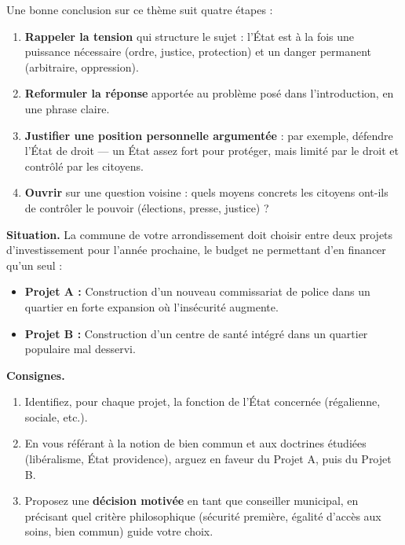 \documentclass[11pt]{article}
\newcommand{\cle}[1]{{\popxbold\color{popdark}#1}}
\begin{document}
\begin{methode}
Une bonne conclusion sur ce thème suit quatre étapes :
\begin{enumerate}
\item \textbf{Rappeler la tension} qui structure le sujet : l'État est à la fois une puissance nécessaire (ordre, justice, protection) et un danger permanent (arbitraire, oppression).
\item \textbf{Reformuler la réponse} apportée au problème posé dans l'introduction, en une phrase claire.
\item \textbf{Justifier une position personnelle argumentée} : par exemple, défendre l'État de droit — un État assez fort pour protéger, mais limité par le droit et contrôlé par les citoyens.
\item \textbf{Ouvrir} sur une question voisine : quels moyens concrets les citoyens ont-ils de contrôler le pouvoir (élections, presse, justice) ?
\end{enumerate}
\end{methode}

\begin{exercice}
\textbf{Situation.} La commune de votre arrondissement doit choisir entre deux projets d'investissement pour l'année prochaine, le budget ne permettant d'en financer qu'un seul :
\begin{itemize}
\item \textbf{Projet A :} Construction d'un nouveau commissariat de police dans un quartier en forte expansion où l'insécurité augmente.
\item \textbf{Projet B :} Construction d'un centre de santé intégré dans un quartier populaire mal desservi.
\end{itemize}
\textbf{Consignes.}
\begin{enumerate}
\item Identifiez, pour chaque projet, la \cle{fonction de l'État} concernée (régalienne, sociale, etc.).
\item En vous référant à la notion de \cle{bien commun} et aux doctrines étudiées (libéralisme, État providence), arguez en faveur du Projet A, puis du Projet B.
\item Proposez une \textbf{décision motivée} en tant que conseiller municipal, en précisant quel critère philosophique (sécurité première, égalité d'accès aux soins, bien commun) guide votre choix.
\end{enumerate}
\end{exercice}
\end{document}
